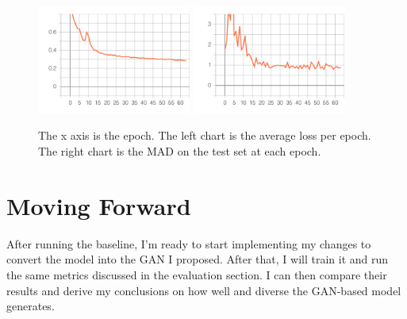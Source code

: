 \documentclass{article}
\begin{document}
\begin{figure}
    \centering
    \includegraphics[width=0.45\textwidth]{loss_train_baseline.pdf}
     \includegraphics[width=0.45\textwidth]{test_mad_train_baseline}\\
    \caption{The x axis is the epoch. The left chart is the average loss per epoch. The right chart is the MAD on the test set at each epoch.}
    \label{baseline_train_loss}
\end{figure}

\section{Moving Forward}
After running the baseline, I'm ready to start implementing my changes to convert the model into the GAN I proposed. After that, I will train it and run the same metrics discussed in the evaluation section.  I can then compare their results and derive my conclusions on how well and diverse the GAN-based model generates. 





\end{document}

